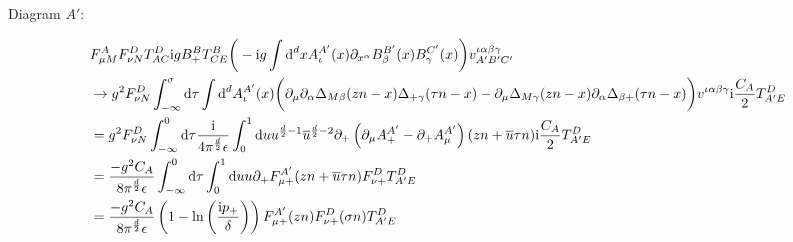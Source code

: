 Diagram $A'$:

\begin{align}
	&F_{\mu M}^{A}F _{\nu N}^D T^D_{AC}\text{i} g B_+^B  T^B_{CE}\bigg(-\text{i} g \int \text{d} ^d xA_\iota^{A'}(x) \partial_{x^\alpha} B_\beta^{B'} (x) B_\gamma^{C'}(x) \bigg) v^{\iota \alpha\beta\gamma}_{A'B'C'}
	\\
	&\rightarrow
	g^2F _{\nu N}^D\int_{-\infty}^\sigma \text{d} \tau \int \text{d} ^d A^{A'}_\iota(x) \bigg( \partial_\mu \partial_\alpha \Delta_{M\beta}(zn-x) \Delta_{+\gamma}(\tau n -x) -\partial_\mu \Delta_{M\gamma}(zn-x) \partial_\alpha \Delta_{\beta+}(\tau n -x) \bigg)v^{\iota \alpha\beta\gamma}\text{i} \frac{C_A}{2}T^D_{A'E}
	\\
	&=
	g^2F _{\nu N}^D\int_{-\infty}^0 \text{d} \tau \frac{\text{i}}{4\pi^{\frac{d}{2}}\epsilon}\int _0^1 \text{d} u u^{\frac{d}{2}-1} \overline u ^{\frac{d}{2}-2}   \partial_+ \left( \partial_\mu A_+^{A'} - \partial_+ A_\mu^{A'}\right)(zn+\overline u \tau n)\text{i} \frac{C_A}{2}T^D_{A'E}
	\\
	&=
	\frac{-g^2C_A}{8\pi^{\frac{d}{2}}\epsilon}\int_{-\infty}^0\text{d} \tau\int _0^1 \text{d} u u  \partial_+ F_{\mu +}^{A'}(zn+\overline u \tau n)F _{\nu +}^DT^D_{A'E}
	\\
	&=
	\frac{-g^2C_A}{8\pi^{\frac{d}{2}}\epsilon}\left(1-\ln\left(\frac{\text{i} p_{+}}{\delta}\right)\right)F_{\mu +}^{A'}(zn)F _{\nu +}^D(\sigma n)T^D_{A'E}
\end{align}

